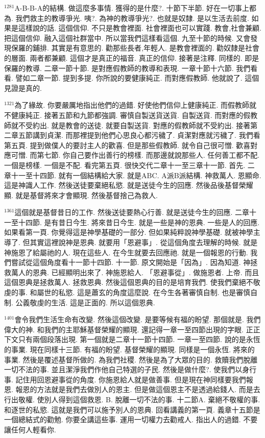 \documentclass{book}
\begin{document}
$^{1281}$A-B-B-A的結構.
做這麼多事情.
獲得的是什麼?.
十節下半節.
好在一切事上都為.
我們救主的教導爭光.
咦?.
為神的教導爭光?.
也就是奴隸.
是以生活去前度.
如果是這樣說的話.
這個信仰.
不只是教會裡面.
社會裡面也可以實踐.
教會,社會兼顧.
把這個信仰.
融入這個社群當中.
所以當我們這樣看這個.
九至十節的時候.
又會發現保羅的鋪排.
其實是有意思的.
勸那些長者,年輕人.
是教會裡面的.
勸奴隸是社會的層面.
兩者都兼顧.
這個才是真正的福音.
真正的信仰.
接著是注釋.
同樣的.
即是保羅的教導.
二章一節十節.
是對應假教師的教導和表現.
一章十節十六節.
我們看看.
譬如二章一節.
提到多提.
你所說的要健康純正.
而對應假教師.
他就說了.
這個見證是真的.

$^{1321}$為了緣故.
你要嚴厲地指出他們的過錯.
好使他們信仰上健康純正.
而假教師就不健康純正.
接著五節和九節都強調.
審慎自製送貨送貨.
自製送貨.
而對應的假教師就不受約出.
就是教會的送徒.
就要自製送貨.
對應的假教師就不受約出.
接著第二章五節講到貞潔.
而那裡提到他們心思良心都污穢了.
貞潔對應就污穢了.
我們看第五頁.
提到做僕人的要討主人的歡喜.
但是那些假教師.
就令自己很可憎.
歡喜對應可憎.
而第七節.
你自己要作出善行的榜樣.
而那邊就說那些人.
任何善工都不配.
一個是榜樣.
一個是不配.
看完第五頁.
很快交代二章十一至三章十一節.
首先.
二章十一至十四節.
就有一個結構給大家.
就是ABC.
A派B派結構.
神救萬人.
恩顯命.
這是神識人工作.
然後送徒要棄絕私慾.
就是送徒今生的回應.
然後品後基督榮耀顯.
就是基督將來才會顯現.
然後基督捨己為救人.

$^{1361}$這個就是基督昔日的工作.
然後送徒要熱心行善.
就是送徒今生的回應.
二章十一至十四節.
是有昔日今生.
將來昔日今生.
就是一些是神的恩典.
一些是人的回應.
如果看第一頁.
你覺得這是神學基礎的一部分.
但如果純粹說神學基礎.
就被神學主導了.
但其實這裡說神是恩典.
就要用「恩避事」.
從這個角度去理解的時候.
就是神施恩了給屬祂的人.
現在這些人.
在今生就要去回應祂.
就是一個報恩的行動.
我們嘗試從這個角度看十一節十四節.
十一節.
原文開始是「因為」.
因為知道.
神拯救萬人的恩典.
已經顯明出來了.
神施恩給人.
「恩避事從」.
做施恩者.
上帝.
而且這個恩典是拯救萬人.
拯救恩典.
然後這個恩典的目的是培育我們.
使我們棄絕不敬虔的事.
和屬世的私慾.
這是蕭玄的角度這麼說.
在今生各著審慎自制.
也是審慎自制.
公義敬虔的生活.
這是正面的.
所以這個恩典.

$^{1401}$會令我們生活生命有改變.
然後這個改變.
是要等候有福的盼望.
那個就是.
我們偉大的神.
和我們的主耶穌基督榮耀的顯現.
還記得一章一至四節出現的字眼.
正正下文只有兩個段落出現.
第一個就是二章十一節十四節.
一章一至四節.
說的是永恆的事業.
現在同樣十三節.
有福的盼望.
基督榮耀的顯現.
同樣是一個永恆.
將來的事業.
然後是覆述基督所做的.
為我們社稷.
然後是為了大眾的目的.
救贖我們脫離一切不法的事.
並且潔淨我們作他自己特選的子民.
然後是做什麼?.
使我們以身行事.
記住用回恩避事從的角度.
你施恩給人就是做善事.
但是現在神同樣要我們報恩.
報恩的方法就是我們去做別人的恩主.
但是做這個恩主不是透過給錢人.
而是去行出敬權.
使別人得到這個救恩.
B. 脫離一切不法的事.
十二節A. 棄絕不敬權的事.
和逐世的私慾.
這就是我們可以施予別人的恩典.
回看講義的第一頁.
義章十五節是一個總結式的勸勉.
你要全講這些事.
運用一切權力去勸戒人.
指出人的過錯.
不要讓任何人輕看你.
\end{document}
